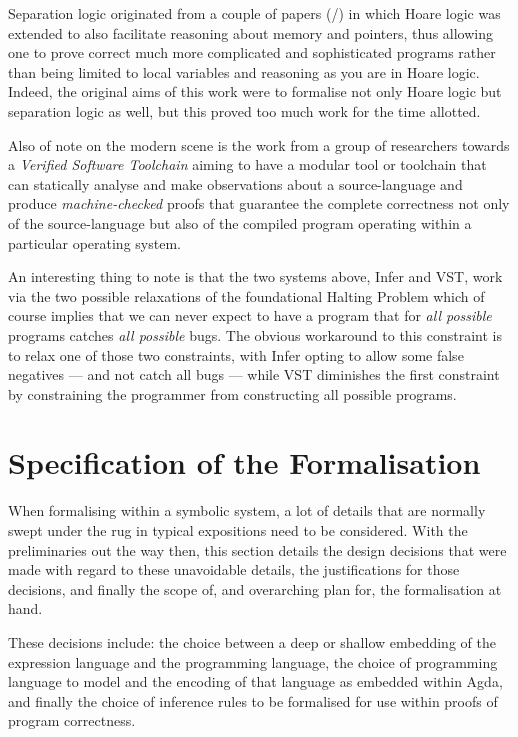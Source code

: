 \documentclass[oneside,12pt]{article}
\begin{document}
Separation logic originated from a couple of papers (\cite{sep2001}/\cite{reynolds2002separation}) in which Hoare logic was extended to also facilitate reasoning about memory and pointers, thus allowing one to prove correct much more complicated and sophisticated programs rather than being limited to local variables and reasoning as you are in Hoare logic. Indeed, the original aims of this work were to formalise not only Hoare logic but separation logic as well, but this proved too much work for the time allotted.

Also of note on the modern scene is the work from a group of researchers towards a \emph{Verified Software Toolchain}\cite{vst} aiming to have a modular tool or toolchain that can statically analyse and make observations about a source-language and produce \emph{machine-checked} proofs that guarantee the complete correctness not only of the source-language but also of the compiled program operating within a particular operating system.

An interesting thing to note is that the two systems above, Infer and VST, work via the two possible relaxations of the foundational Halting Problem which of course implies that we can never expect to have a program that for \emph{all possible} programs catches \emph{all possible} bugs. The obvious workaround to this constraint is to relax one of those two constraints, with Infer opting to allow some false negatives --- and not catch all bugs --- while VST diminishes the first constraint by constraining the programmer from constructing all possible programs.


\pagebreak


\section{Specification of the Formalisation}


When formalising within a symbolic system, a lot of details that are normally swept under the rug in typical expositions need to be considered. With the preliminaries out the way then, this section details the design decisions that were made with regard to these unavoidable details, the justifications for those decisions, and finally the scope of, and overarching plan for, the formalisation at hand.

These decisions include: the choice between a deep or shallow embedding of the expression language and the programming language, the choice of programming language to model and the encoding of that language as embedded within Agda, and finally the choice of inference rules to be formalised for use within proofs of program correctness.
\end{document}
